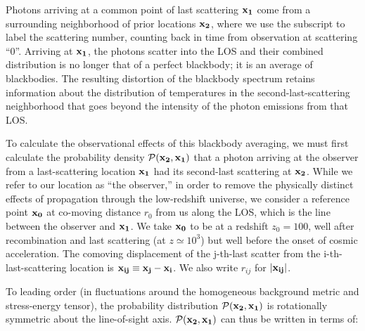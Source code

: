 \documentclass[fleqn,usenatbib]{mnras}
\begin{document}
    Photons arriving at a common point of last scattering $\mathbf{x_1}$ come from
    a surrounding neighborhood of prior locations $\mathbf{x_2}$, where we use the
    subscript to label the scattering number, counting back in time from
    observation at scattering ``0''.  Arriving at $\mathbf{x_1}$, the photons
    scatter into the LOS and their combined distribution is no longer that of a
    perfect blackbody; it is an average of blackbodies.  The resulting
    distortion of the blackbody spectrum retains information about the
    distribution of temperatures in the second-last-scattering neighborhood that
    goes beyond the intensity of the photon emissions from that LOS.

    To calculate the observational effects of this blackbody averaging, we must
    first calculate the probability density $\mathcal{P}(\mathbf{x_2},\mathbf{x_1})$ that
    a photon arriving at the observer from a last-scattering location
    $\mathbf{x_1}$ had its second-last scattering at $\mathbf{x_2}$.  While we refer
    to our location as ``the observer,'' in order to remove the physically
    distinct effects of propagation through the low-redshift universe, we
    consider a reference point $\mathbf{x_0}$ at co-moving distance $r_0$ from us
    along the LOS, which is the line between the observer and $\mathbf{x_1}$.  We
    take $\mathbf{x_0}$ to be at a redshift $z_0=100$, well after recombination and
    last scattering (at $z\simeq10^3$) but well before the onset of cosmic
    acceleration.  The comoving displacement of the j-th-last scatter from the
    i-th-last-scattering location is $\mathbf{x_{ij}}\equiv\mathbf{x_j}-\mathbf{x_i}$.
    We also write $r_{ij}$ for $\lvert \mathbf{x_{ij}} \rvert$.

    To leading order (in fluctuations around the homogeneous background metric
    and stress-energy tensor), the probability distribution $\mathcal{P}(\mathbf{x_2},
    \mathbf{x_1})$ is rotationally symmetric about the line-of-sight axis.
    $\mathcal{P}(\mathbf{x_2},\mathbf{x_1})$ can thus be written in terms of:
    
\end{document}
